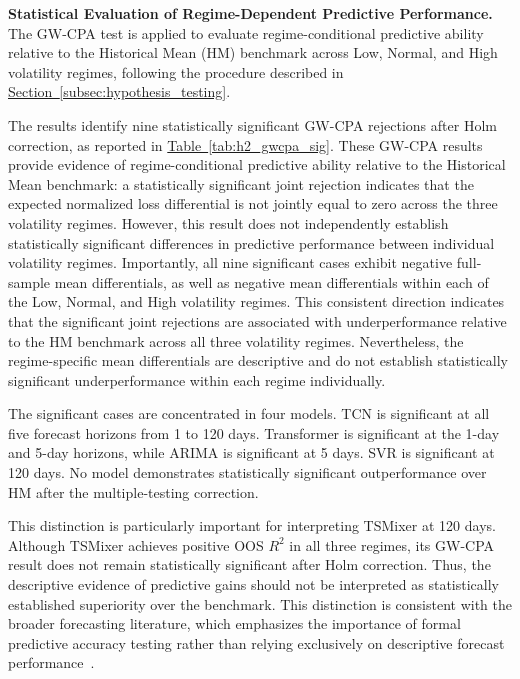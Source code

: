 \documentclass[runningheads,orivec]{llncs}
\begin{document}
\noindent\textbf{Statistical Evaluation of Regime-Dependent Predictive Performance.}
The GW-CPA test is applied to evaluate regime-conditional predictive ability relative to the Historical Mean (HM) benchmark across Low, Normal, and High volatility regimes, following the procedure described in \hyperref[subsec:hypothesis_testing]{Section~\ref*{subsec:hypothesis_testing}}.

The results identify nine statistically significant GW-CPA rejections after Holm correction, as reported in \hyperref[tab:h2_gwcpa_sig]{Table~\ref*{tab:h2_gwcpa_sig}}. These GW-CPA results provide evidence of regime-conditional predictive ability relative to the Historical Mean benchmark: a statistically significant joint rejection indicates that the expected normalized loss differential is not jointly equal to zero across the three volatility regimes. However, this result does not independently establish statistically significant differences in predictive performance between individual volatility regimes. Importantly, all nine significant cases exhibit negative full-sample mean differentials, as well as negative mean differentials within each of the Low, Normal, and High volatility regimes. This consistent direction indicates that the significant joint rejections are associated with underperformance relative to the HM benchmark across all three volatility regimes. Nevertheless, the regime-specific mean differentials are descriptive and do not establish statistically significant underperformance within each regime individually.

The significant cases are concentrated in four models. TCN is significant at all five forecast horizons from 1 to 120 days. Transformer is significant at the 1-day and 5-day horizons, while ARIMA is significant at 5 days. SVR is significant at 120 days. No model demonstrates statistically significant outperformance over HM after the multiple-testing correction.

This distinction is particularly important for interpreting TSMixer at 120 days. Although TSMixer achieves positive OOS $R^2$ in all three regimes, its GW-CPA result does not remain statistically significant after Holm correction. Thus, the descriptive evidence of predictive gains should not be interpreted as statistically established superiority over the benchmark. This distinction is consistent with the broader forecasting literature, which emphasizes the importance of formal predictive accuracy testing rather than relying exclusively on descriptive forecast performance~\cite{diebold1995,giacomini2006,giacomini2010}.
\end{document}
